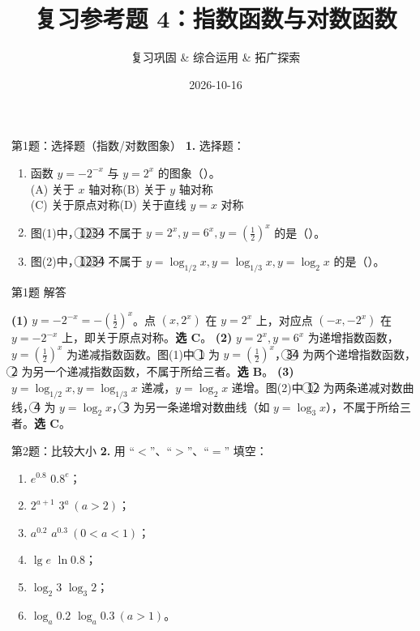 \documentclass[10pt,aspectratio=169,serif]{beamer}
\title[复习参考题4]{复习参考题 4：指数函数与对数函数}
\subtitle{复习巩固 \& 综合运用 \& 拓广探索}
\author{}
\institute{}
\date{2026-10-16}
\begin{document}
\begin{frame}
  \titlepage
\end{frame}

\begin{frame}[t]{第1题：选择题（指数/对数图象）}
\textbf{1.} 选择题：
\begin{enumerate}[(1)]
  \item 函数 $y=-2^{-x}$ 与 $y=2^{x}$ 的图象（\quad）。\\
  (A) 关于 $x$ 轴对称\qquad (B) 关于 $y$ 轴对称\\
  (C) 关于原点对称\qquad (D) 关于直线 $y=x$ 对称
  \item 图(1)中，\textcircled{1}\textcircled{2}\textcircled{3}\textcircled{4} 不属于 $y=2^{x},y=6^{x},y=(\tfrac12)^{x}$ 的是（\quad）。
  \item 图(2)中，\textcircled{1}\textcircled{2}\textcircled{3}\textcircled{4} 不属于 $y=\log_{1/2}x,y=\log_{1/3}x,y=\log_{2}x$ 的是（\quad）。
\end{enumerate}
\end{frame}

\begin{frame}[t]{第1题 解答}
\begin{tcolorbox}[colback=orange!10,colframe=orange,title=\textbf{解}]
\textbf{(1)} $y=-2^{-x}=-(\tfrac12)^{x}$。点 $(x,2^{x})$ 在 $y=2^{x}$ 上，对应点 $(-x,-2^{x})$ 在 $y=-2^{-x}$ 上，即关于原点对称。\textbf{选 C}。
\smallskip
\textbf{(2)} $y=2^{x},y=6^{x}$ 为递增指数函数，$y=(\tfrac12)^{x}$ 为递减指数函数。图(1)中 \textcircled{1} 为 $y=(\tfrac12)^{x}$，\textcircled{3}\textcircled{4} 为两个递增指数函数，\textcircled{2} 为另一个递减指数函数，不属于所给三者。\textbf{选 B}。
\smallskip
\textbf{(3)} $y=\log_{1/2}x,y=\log_{1/3}x$ 递减，$y=\log_{2}x$ 递增。图(2)中 \textcircled{1}\textcircled{2} 为两条递减对数曲线，\textcircled{4} 为 $y=\log_{2}x$，\textcircled{3} 为另一条递增对数曲线（如 $y=\log_{3}x$），不属于所给三者。\textbf{选 C}。
\end{tcolorbox}
\end{frame}

\begin{frame}[t]{第2题：比较大小}
\textbf{2.} 用 ``$<$''、``$>$''、``$=$'' 填空：
\begin{enumerate}[(1)]
  \item $e^{0.8}$ \underline{\quad} $0.8^{e}$；
  \item $2^{a+1}$ \underline{\quad} $3^{a}\ (a>2)$；
  \item $a^{0.2}$ \underline{\quad} $a^{0.3}\ (0<a<1)$；
  \item $\lg e$ \underline{\quad} $\ln 0.8$；
  \item $\log_{2}3$ \underline{\quad} $\log_{3}2$；
  \item $\log_{a}0.2$ \underline{\quad} $\log_{a}0.3\ (a>1)$。
\end{enumerate}
\end{frame}
\end{document}
